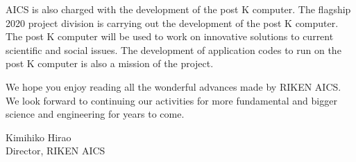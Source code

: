 AICS is also charged with the development of the post K computer. The flagship 2020 project division is carrying out the development of the post K computer. The post K computer will be used to work on innovative solutions to current scientific and social issues. The development of application codes to run on the post K computer is also a mission of the project.

We hope you enjoy reading all the wonderful advances made by RIKEN AICS. We look forward to continuing our activities for more fundamental and bigger science and engineering for years to come.

\vspace{1cm}

\noindent
Kimihiko Hirao\\
Director, RIKEN AICS
